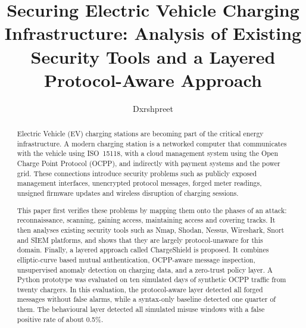 \documentclass[runningheads]{llncs}
\begin{document}
\title{Securing Electric Vehicle Charging Infrastructure: Analysis of Existing Security Tools and a Layered Protocol-Aware Approach}

\author{Dxrshpreet}

\maketitle

\begin{abstract}
Electric Vehicle (EV) charging stations are becoming part of the critical energy infrastructure. A modern charging station is a networked computer that communicates with the vehicle using ISO~15118, with a cloud management system using the Open Charge Point Protocol (OCPP), and indirectly with payment systems and the power grid. These connections introduce security problems such as publicly exposed management interfaces, unencrypted protocol messages, forged meter readings, unsigned firmware updates and wireless disruption of charging sessions.

This paper first verifies these problems by mapping them onto the phases of an attack: reconnaissance, scanning, gaining access, maintaining access and covering tracks. It then analyses existing security tools such as Nmap, Shodan, Nessus, Wireshark, Snort and SIEM platforms, and shows that they are largely protocol-unaware for this domain. Finally, a layered approach called ChargeShield is proposed. It combines elliptic-curve based mutual authentication, OCPP-aware message inspection, unsupervised anomaly detection on charging data, and a zero-trust policy layer. A Python prototype was evaluated on ten simulated days of synthetic OCPP traffic from twenty chargers. In this evaluation, the protocol-aware layer detected all forged messages without false alarms, while a syntax-only baseline detected one quarter of them. The behavioural layer detected all simulated misuse windows with a false positive rate of about 0.5\%.

\end{abstract}
\end{document}
